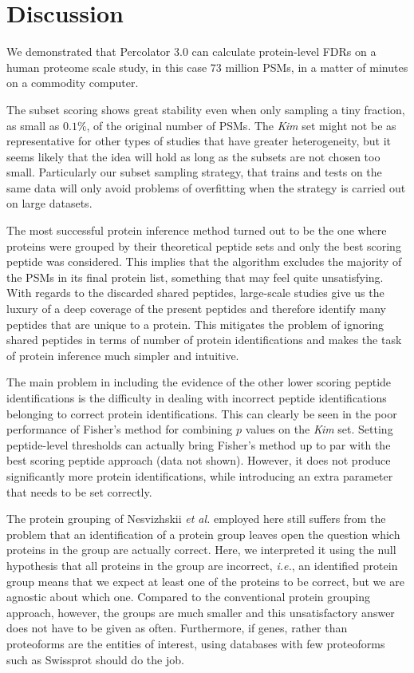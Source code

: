 \documentclass{article}
\begin{document}
\section*{Discussion}

We demonstrated that Percolator 3.0 can calculate protein-level FDRs
on a human proteome scale study, in this case $73$ million PSMs, in a
matter of minutes on a commodity computer.

The subset scoring shows great stability even when only sampling a
tiny fraction, as small as $0.1\%$, of the original number of PSMs.
The {\em Kim} set might not be as representative for other types of
studies that have greater heterogeneity, but it seems likely that the
idea will hold as long as the subsets are not chosen too small.
Particularly our subset sampling strategy, that trains and tests on
the same data will only avoid problems of overfitting when the
strategy is carried out on large datasets.

The most successful protein inference method turned out to be the one
where proteins were grouped by their theoretical peptide sets and only
the best scoring peptide was considered. This implies that the
algorithm excludes the majority of the PSMs in its final protein list,
something that may feel quite unsatisfying. With regards to the
discarded shared peptides, large-scale studies give us the luxury of a
deep coverage of the present peptides and therefore identify many
peptides that are unique to a protein. This mitigates the problem of
ignoring shared peptides in terms of number of protein identifications
and makes the task of protein inference much simpler and intuitive.

The main problem in including the evidence of the other lower scoring
peptide identifications is the difficulty in dealing with incorrect
peptide identifications belonging to correct protein identifications.
This can clearly be seen in the poor performance of Fisher's method
for combining $p$ values on the {\em Kim} set. Setting
peptide-level thresholds can actually bring Fisher's method up to par
with the best scoring peptide approach (data not shown). However,
it does not produce significantly more protein identifications,
while introducing an extra parameter that needs to be set correctly.

The protein grouping of Nesvizhskii {\em et al.} employed here still
suffers from the problem that an identification of a protein group
leaves open the question which proteins in the group are actually
correct. Here, we interpreted it using the null hypothesis that all
proteins in the group are incorrect, {\em i.e.}, an identified protein
group means that we expect at least one of the proteins to be correct,
but we are agnostic about which one. Compared to the conventional
protein grouping approach, however, the groups are much smaller and
this unsatisfactory answer does not have to be given as often.
Furthermore, if genes, rather than proteoforms are the entities of
interest, using databases with few proteoforms such as Swissprot
should do the job.
\end{document}
